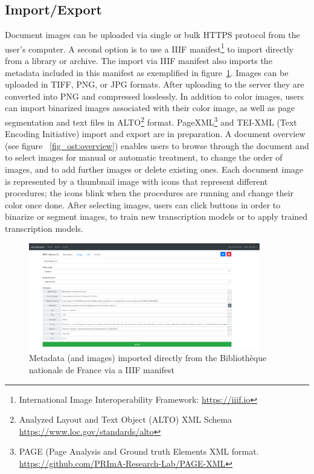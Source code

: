 \subsection{Import/Export}

Document images can be uploaded via single or bulk HTTPS protocol from the
user’s computer. A second option is to use a
IIIF manifest\footnote{International Image Interoperability Framework:
\url{https://iiif.io}} to import directly from a library or archive. The import
via IIIF manifest also imports the metadata included in this manifest as
exemplified in figure~\ref{fig_ost:iiif}.  Images can be uploaded in TIFF, PNG, or JPG formats.
After uploading to the server they are converted into PNG and compressed
losslessly. In addition to color images, users can import binarized images
associated with their color image, as well as page segmentation and text files
in ALTO\footnote{Analyzed Layout and Text Object (ALTO) XML Schema
\url{https://www.loc.gov/standards/alto}} format.  PageXML\footnote{PAGE (Page
Analysis and Ground truth Elements XML format.
\url{https://github.com/PRImA-Research-Lab/PAGE-XML}} and TEI-XML (Text
Encoding Initiative) import and export are in preparation. A document overview
(see figure ~\ref{fig_ost:overview}) enables users to browse through the document and to select images
for manual or automatic treatment, to change the order of images, and to add
further images or delete existing ones.  Each document image is represented by
a thumbnail image with icons that represent different procedures; the icons
blink when the procedures are running and change their color once done. After
selecting images, users can click buttons in order to binarize or segment
images, to train new transcription models or to apply trained transcription
models.

\begin{figure}
	\centering
	\includegraphics[width=0.9\textwidth]{IIIF_import.png}
	\caption{Metadata (and images) imported directly from the Bibliothèque nationale de France via a IIIF manifest}
	\label{fig_ost:iiif}
\end{figure}


